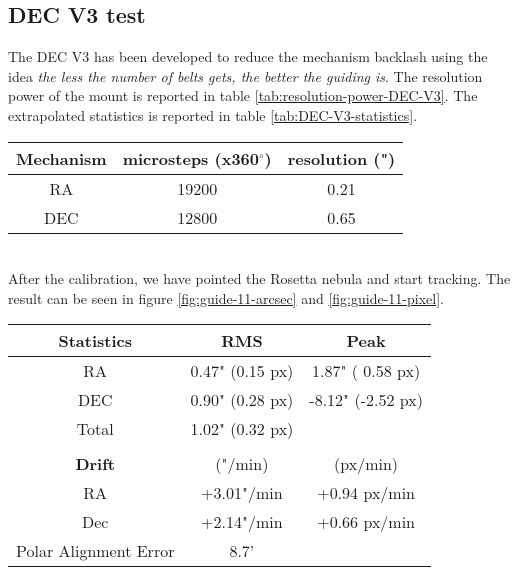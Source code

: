 \subsection{DEC V3 test}
The DEC V3 has been developed to reduce the mechanism backlash using the idea \textit{the less the number of belts gets, the better the guiding is}.
The resolution power of the mount is reported in table \ref{tab:resolution-power-DEC-V3}.
The extrapolated statistics is reported in table \ref{tab:DEC-V3-statistics}.
\\
\begin{minipage}
    {.5\textwidth}
    \begin{tabular}{ccc}
        Mechanism & microsteps (x360$^{\circ}$) & resolution (") \\
        \hline
        RA  & 19200 & 0.21\\ 
        DEC & 12800 & 0.65
    \end{tabular}
    \label{tab:resolution-power-DEC-V3}
\end{minipage}
\\
After the calibration, we have pointed the Rosetta nebula and start tracking.
The result can be seen in figure \ref{fig:guide-11-arcsec} and \ref{fig:guide-11-pixel}.
\\
\begin{minipage}{.4\textwidth}
    \centering
    \begin{tabular}{ccc}
        \textbf{Statistics}&RMS&Peak\\
        \hline
        RA& 0.47" (0.15 px)& 1.87" ( 0.58 px)\\
        DEC& 0.90" (0.28 px)&-8.12" (-2.52 px)\\
        Total& 1.02" (0.32 px)&\\
        \\
        \textbf{Drift}& ("/min) & (px/min)\\
        \hline
        RA& +3.01"/min& +0.94 px/min\\
        Dec& +2.14"/min& +0.66 px/min\\
        Polar Alignment Error& 8.7'&\\
        \hline
    \end{tabular}
    \label{tab:DEC-V3-statistics}
\end{minipage}